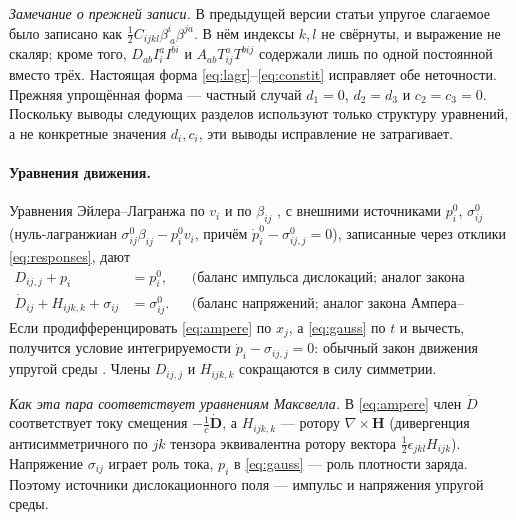 \documentclass[12pt,a4paper]{article}
\begin{document}
\textit{Замечание о прежней записи.} В предыдущей версии статьи упругое слагаемое
было записано как $\tfrac12C_{ijkl}\beta^i_{\ a}\beta^{ja}$. В нём индексы $k,l$
не свёрнуты, и выражение не скаляр; кроме того, $D_{ab}I^a_iI^{bi}$ и
$A_{ab}T^a_{ij}T^{bij}$ содержали лишь по одной постоянной вместо трёх. Настоящая
форма \eqref{eq:lagr}--\eqref{eq:constit} исправляет обе неточности. Прежняя
упрощённая форма --- частный случай $d_1=0$, $d_2=d_3$ и $c_2=c_3=0$. Поскольку
выводы следующих разделов используют только структуру уравнений, а не конкретные
значения $d_i,c_i$, эти выводы исправление не затрагивает.

\paragraph{Уравнения движения.} Уравнения Эйлера--Лагранжа по $v_i$ и по
$\beta_{ij}$ \cite[ур.~(5)--(6)]{lazar2010pla}, с внешними источниками $p^0_i$,
$\sigma^0_{ij}$ (нуль-лагранжиан $\sigma^0_{ij}\beta_{ij}-p^0_iv_i$, причём
$\dot p^0_i-\sigma^0_{ij,j}=0$), записанные через отклики \eqref{eq:responses},
дают \cite[ур.~(7)--(8)]{lazar2010pla}
\begin{align}
D_{ij,j}+p_i&=p^0_i, &&\text{(баланс импульса дислокаций; аналог закона Гаусса)}\label{eq:gauss}\\
\dot D_{ij}+H_{ijk,k}+\sigma_{ij}&=\sigma^0_{ij}. &&\text{(баланс напряжений; аналог закона Ампера--Максвелла)}\label{eq:ampere}
\end{align}
Если продифференцировать \eqref{eq:ampere} по $x_j$, а \eqref{eq:gauss} по $t$ и
вычесть, получится условие интегрируемости $\dot p_i-\sigma_{ij,j}=0$: обычный
закон движения упругой среды \cite[ур.~(9)]{lazar2010pla}. Члены $D_{ij,j}$ и
$H_{ijk,k}$ сокращаются в силу симметрии.

\textit{Как эта пара соответствует уравнениям Максвелла.} В \eqref{eq:ampere} член
$\dot D$ соответствует току смещения $-\frac1c\dot{\mathbf D}$, а $H_{ijk,k}$ ---
ротору $\nabla\times\mathbf H$ (дивергенция антисимметричного по $jk$ тензора
эквивалентна ротору вектора $\tfrac12\epsilon_{jkl}H_{ijk}$). Напряжение $\sigma_{ij}$
играет роль тока, $p_i$ в \eqref{eq:gauss} --- роль плотности заряда. Поэтому
источники дислокационного поля --- импульс и напряжения упругой среды.
\end{document}
